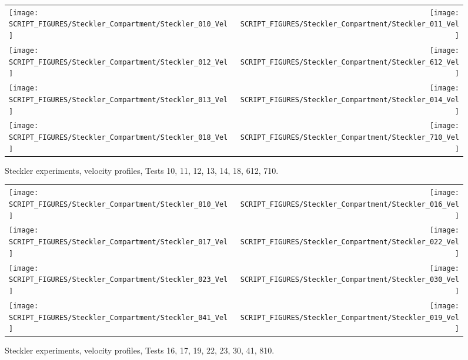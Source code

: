 \newpage

\begin{figure}[p]
\begin{tabular*}{\textwidth}{l@{\extracolsep{\fill}}r}
\texttt{[image: SCRIPT\_FIGURES/Steckler\_Compartment/Steckler\_010\_Vel]} &
\texttt{[image: SCRIPT\_FIGURES/Steckler\_Compartment/Steckler\_011\_Vel]} \\
\texttt{[image: SCRIPT\_FIGURES/Steckler\_Compartment/Steckler\_012\_Vel]} &
\texttt{[image: SCRIPT\_FIGURES/Steckler\_Compartment/Steckler\_612\_Vel]} \\
\texttt{[image: SCRIPT\_FIGURES/Steckler\_Compartment/Steckler\_013\_Vel]} &
\texttt{[image: SCRIPT\_FIGURES/Steckler\_Compartment/Steckler\_014\_Vel]} \\
\texttt{[image: SCRIPT\_FIGURES/Steckler\_Compartment/Steckler\_018\_Vel]} &
\texttt{[image: SCRIPT\_FIGURES/Steckler\_Compartment/Steckler\_710\_Vel]}
\end{tabular*}
\caption[Steckler experiments, velocity profiles, Tests 10, 11, 12, 13, 14, 18, 612, 710]{Steckler experiments, velocity profiles, Tests 10, 11, 12, 13, 14, 18, 612, 710.}
\label{Steckler_Vel_1}
\end{figure}

\begin{figure}[p]
\begin{tabular*}{\textwidth}{l@{\extracolsep{\fill}}r}
\texttt{[image: SCRIPT\_FIGURES/Steckler\_Compartment/Steckler\_810\_Vel]} &
\texttt{[image: SCRIPT\_FIGURES/Steckler\_Compartment/Steckler\_016\_Vel]} \\
\texttt{[image: SCRIPT\_FIGURES/Steckler\_Compartment/Steckler\_017\_Vel]} &
\texttt{[image: SCRIPT\_FIGURES/Steckler\_Compartment/Steckler\_022\_Vel]} \\
\texttt{[image: SCRIPT\_FIGURES/Steckler\_Compartment/Steckler\_023\_Vel]} &
\texttt{[image: SCRIPT\_FIGURES/Steckler\_Compartment/Steckler\_030\_Vel]} \\
\texttt{[image: SCRIPT\_FIGURES/Steckler\_Compartment/Steckler\_041\_Vel]} &
\texttt{[image: SCRIPT\_FIGURES/Steckler\_Compartment/Steckler\_019\_Vel]}
\end{tabular*}
\caption[Steckler experiments, velocity profiles, Tests 16, 17, 19, 22, 23, 30, 41, 810]{Steckler experiments, velocity profiles, Tests 16, 17, 19, 22, 23, 30, 41, 810.}
\label{Steckler_Vel_2}
\end{figure}


